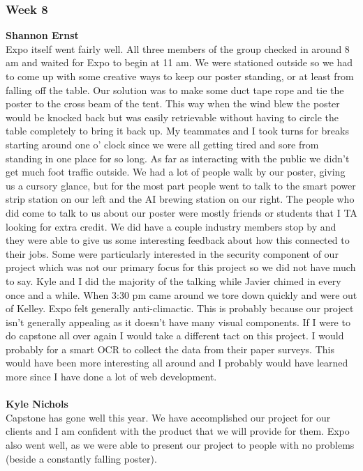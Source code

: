 \documentclass[../final.tex]{subfiles}
\begin{document}
\subsubsection{Week 8}
\textbf{Shannon Ernst}\\
Expo itself went fairly well. All three members of the group checked in around 8 am and waited for Expo to begin at 11 am. We were stationed outside so we had to come up with some creative ways to keep our poster standing, or at least from falling off the table. Our solution was to make some duct tape rope and tie the poster to the cross beam of the tent. This way when the wind blew the poster would be knocked back but was easily retrievable without having to circle the table completely to bring it back up. My teammates and I took turns for breaks starting around one o' clock since we were all getting tired and sore from standing in one place for so long. As far as interacting with the public we didn't get much foot traffic outside. We had a lot of people walk by our poster, giving us a cursory glance, but for the most part people went to talk to the smart power strip station on our left and the AI brewing station on our right. The people who did come to talk to us about our poster were mostly friends or students that I TA looking for extra credit. We did have a couple industry members stop by and they were able to give us some interesting feedback about how this connected to their jobs. Some were particularly interested in the security component of our project which was not our primary focus for this project so we did not have much to say. Kyle and I did the majority of the talking while Javier chimed in every once and a while. When 3:30 pm came around we tore down quickly and were out of Kelley. Expo felt generally anti-climactic. This is probably because our project isn't generally appealing as it doesn't have many visual components. If I were to do capstone all over again I would take a different tact on this project. I would probably for a smart OCR to collect the data from their paper surveys. This would have been more interesting all around and I probably would have learned more since I have done a lot of web development. \\ \\
\textbf{Kyle Nichols}\\
Capstone has gone well this year. We have accomplished our project for our clients and I am confident with the product that we will provide for them. Expo also went well, as we were able to present our project to people with no problems (beside a constantly falling poster).
\end{document}
